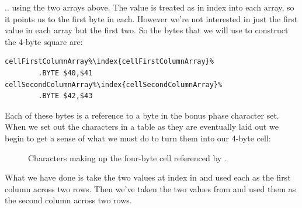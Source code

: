 .. using the two arrays above. The value  is treated as in index into each array, so it
points us to the first byte in each. However we're not interested in just the first value in each array
but the first two. So the bytes that we will use to construct the 4-byte square are:


\begin{lstlisting}[escapechar=\%]
cellFirstColumnArray%\index{cellFirstColumnArray}%
        .BYTE $40,$41
cellSecondColumnArray%\index{cellSecondColumnArray}%   
        .BYTE $42,$43
\end{lstlisting}

Each of these bytes is a reference to a byte in the bonus phase character set. When we set out the
characters in a table as they are eventually laid out we begin to get a sense of what we must do
to turn them into our 4-byte cell:

\begin{figure}[H]                          
{                                          
  \setlength{\tabcolsep}{3.0pt}            
  \setlength\cmidrulewidth{\lightrulewidth}
    \begin{adjustbox}{width=5cm,center}
\begin{subfigure}{0.12\textwidth}

\end{subfigure}
\begin{subfigure}{0.12\textwidth}

\end{subfigure}
    \end{adjustbox}
    \begin{adjustbox}{width=5cm,center}
\begin{subfigure}{0.12\textwidth}

\end{subfigure}
\begin{subfigure}{0.12\textwidth}

\end{subfigure}
    \end{adjustbox}
  }\caption[]{Characters making up the four-byte cell referenced by .}
\end{figure}

What we have done is take the two values at index  in 
and used each as the first column across two rows. Then we've taken the two values from
 and used them as the second column across two rows. 

